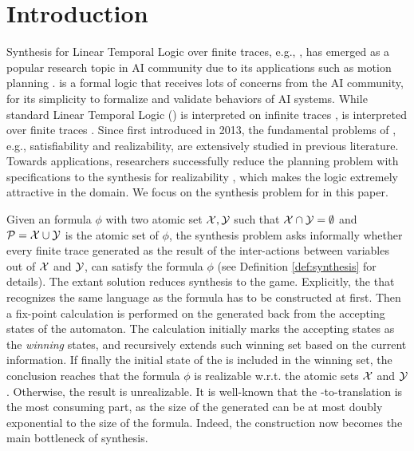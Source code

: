 \section{Introduction}\label{sec:intro}
Synthesis for Linear Temporal Logic over finite traces, e.g., \ltlf\citep{GV13}, has emerged as a popular research topic in AI community due to its applications such as motion planning \citep{ZGPV20,R04}.  
\ltlf is a formal logic that receives lots of concerns from the AI community, for its simplicity to formalize and validate behaviors of AI systems. While standard Linear Temporal Logic (\ltl) is interpreted on infinite traces \citep{Pnu77}, \ltlf is interpreted over finite traces \citep{GV13}. Since first introduced in 2013, the fundamental problems of \ltlf, e.g., satisfiability\citep{LRPZV19} and realizability\citep{Vardi95,GV15,ZTLPV17,PR89}, are extensively studied in previous literature. Towards applications, researchers successfully reduce the planning problem with \ltlf specifications to the synthesis for \ltlf realizability \citep{CTMBM17,ZGPV20,CBM18,AGMR18,AGMR19}, which makes the logic extremely attractive in the domain. We focus on the synthesis problem for \ltlf in this paper.   

Given an \ltlf formula $\phi$ with two atomic set $\mathcal{X},\mathcal{Y}$ such that $\mathcal{X}\cap \mathcal{Y}=\emptyset$ and $\mathcal{P}=\mathcal{X}\cup\mathcal{Y}$ is the atomic set of $\phi$, the synthesis problem asks informally whether every finite trace generated as the result of the inter-actions between variables out of $\mathcal{X}$ and $\mathcal{Y}$, can satisfy the formula $\phi$ (see Definition \ref{def:synthesis} for details). The extant solution reduces \ltlf synthesis to the \dfa game\citep{BM06,Geffner13}. Explicitly, the \dfa that recognizes the same language as the \ltlf formula has to be constructed at first. Then a fix-point calculation is performed on the generated \dfa back from the accepting states of the automaton. The calculation initially marks the accepting states as the \emph{winning} states, and recursively extends such winning set based on the current information. If finally the initial state of the \dfa is included in the winning set, the conclusion reaches that the formula $\phi$ is realizable w.r.t. the atomic sets $\mathcal{X}$ and $\mathcal{Y}$. Otherwise, the result is unrealizable. It is well-known that the \ltlf-to-\dfa translation is the most consuming part, as the size of the generated \dfa can be at most doubly exponential to the size of the formula\citep{KV01d}. Indeed, the \dfa construction now becomes the main bottleneck of \ltlf synthesis.  

